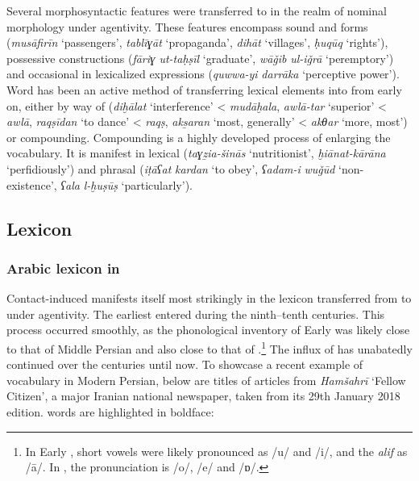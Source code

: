 \documentclass[output=paper]{langsci/langscibook}
\begin{document}
Several  morphosyntactic features were transferred to  in the realm of nominal morphology under  agentivity. These features encompass sound and  forms (\textit{musāfirīn} ‘passengers’, \textit{tablīɣāt} ‘propaganda’, \textit{dihāt} ‘villages’, \textit{ḥuqūq} ‘rights’), possessive constructions (\textit{fāriɣ} \textit{ut-taḥṣīl} ‘graduate’, \textit{wāǧib} \textit{ul-iǧrā} ‘peremptory’) and occasional   in lexicalized expressions (\textit{quwwa-yi} \textit{darrāka} ‘perceptive power’). Word  has been an active method of transferring  lexical elements into  from early on, either by way of  (\textit{diḫālat} ‘interference’ <  \textit{mudāḫala}, \textit{awlā-tar} ‘superior’ <  \textit{awlā}, \textit{raqṣīdan} ‘to dance’ <  \textit{raqṣ}, \textit{aks̱aran} ‘most, generally’ <  \textit{akθar} ‘more, most’) or compounding. Compounding is a highly developed process of enlarging the  vocabulary. It is manifest in lexical  (\textit{taɣẕia-šinās} ‘nutritionist’, \textit{ḫiānat-kārāna} ‘perfidiously’) and phrasal  (\textit{iṭāʕat} \textit{kardan} ‘to obey’, \textit{ʕadam-i} \textit{wuǧūd} ‘non-existence’, \textit{ʕala} \textit{l-ḫuṣūṣ} ‘particularly’).

\subsection{Lexicon}

\subsubsection{Arabic lexicon in }

Contact-induced  manifests itself most strikingly in the lexicon transferred from  to  under  agentivity. The earliest  entered  during the ninth–tenth centuries. This process occurred smoothly, as the phonological inventory of Early  was likely close to that of Middle Persian and also close to that of  .\footnote{In Early , short vowels were likely pronounced as /u/ and /i/, and the \textit{alif} as /ā/. In , the pronunciation is /o/, /e/ and /ɒ/.} The influx of   has unabatedly continued over the centuries until now. To showcase a recent example of  vocabulary in Modern Persian, below are titles of articles from \textit{Hamšahrī} ‘Fellow Citizen’, a major Iranian national newspaper, taken from its 29th January 2018 edition.  words are highlighted in boldface:
\end{document}
